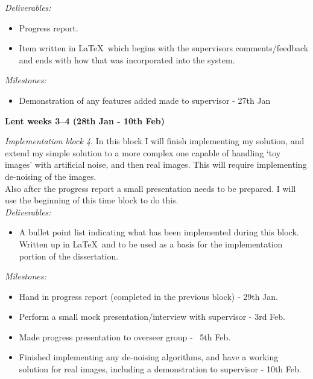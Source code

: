 {\em Deliverables:} 
\begin{itemize} 
    \item 
    Progress report.
    \item 
    Item written in \LaTeX\ which begins with the supervisors comments/feedback 
    and ends with how that was incorporated into the system.
\end{itemize}

{\em Milestones:}
\begin{itemize}
    \item 
    Demonstration of any features added made to supervisor - 27th Jan
\end{itemize}




{\bf Lent weeks 3--4 (28th Jan - 10th Feb)} 

{\em Implementation block 4}. In this block I will finish implementing my 
solution, and extend my simple solution to a more complex one capable of 
handling `toy images' with artificial noise, and then real images. This will 
require implementing de-noising of the images. \\

Also after the progress report a small presentation needs to be prepared. I 
will use the beginning of this time block to do this. \\

{\em Deliverables:} 
\begin{itemize} 
    \item 
    A bullet point list indicating what has been implemented during this block. 
    Written up in \LaTeX\ and to be used as a basis for the implementation 
    portion of the dissertation.
\end{itemize}

{\em Milestones:}
\begin{itemize}
    \item 
    Hand in progress report (completed in the previous block) - 29th Jan.
    \item 
    Perform a small mock presentation/interview with supervisor - 3rd Feb.
    \item 
    Made progress presentation to overseer group - ~5th Feb.
    \item 
    Finished implementing any de-noising algorithms, and have a working solution 
    for real images, including a demonstration to supervisor - 10th Feb.
\end{itemize}




